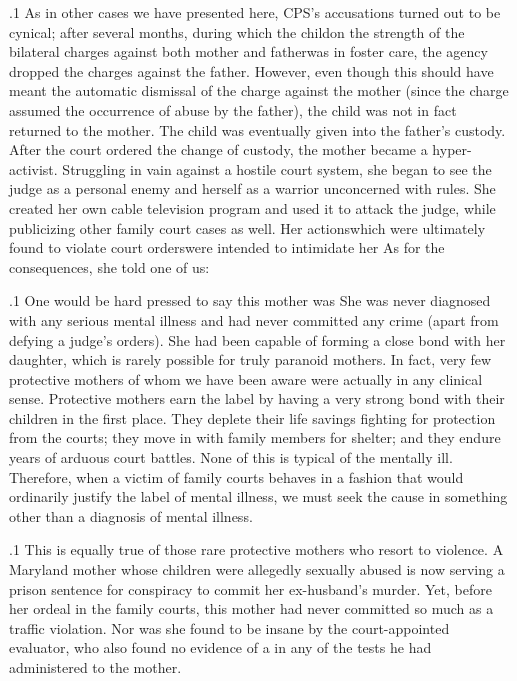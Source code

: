 \documentclass[11pt, twoside]{article}
\begin{document}
{\p.1{%
As in other cases we have presented here, CPS’s accusations turned
out to be cynical; after several months, during which the child\mdash{}on the
strength of the bilateral charges against both mother and father\mdash{}was
in foster care, the agency dropped the charges against the father. However, even though this should have meant the automatic dismissal of the
 charge against the mother (since the charge assumed
the occurrence of abuse by the father), the child was not in fact returned
to the mother. The child was eventually given into the father’s custody.
After the court ordered the change of custody, the mother became
a hyper-activist. Struggling in vain against a hostile court system, she
began to see the judge as a personal enemy and herself as a warrior
unconcerned with rules. She created her own cable television program
and used it to attack the judge, while publicizing other family court
cases as well. Her actions\mdash{}which were ultimately found to violate court
orders\mdash{}were intended to intimidate her  As for the consequences, she told one of us: 
}%

\p.1{%
One would be hard pressed to say this mother was  She was
never diagnosed with any serious mental illness and had never committed any crime (apart from defying a judge’s orders). She had been capable
of forming a close bond with her daughter, which is rarely possible for
truly paranoid mothers. In fact, very few protective mothers of whom we
have been aware were actually  in any clinical sense. Protective
mothers earn the label  by having a very strong bond with
their children in the first place. They deplete their life savings fighting
for protection from the courts; they move in with family members for
shelter; and they endure years of arduous court battles. None of this is
typical of the mentally ill. Therefore, when a victim of family courts behaves in a fashion that would ordinarily justify the label of mental illness,
we must seek the cause in something other than a diagnosis of mental
illness.
}%

\p.1{%
This is equally true of those rare protective mothers who resort to
violence. A Maryland mother whose children were allegedly sexually
abused is now serving a prison sentence for conspiracy to commit her
ex-husband’s murder. Yet, before her ordeal in the family courts, this
mother had never committed so much as a traffic violation. Nor was she
found to be insane by the court-appointed evaluator, who also found no
evidence of a  in any of the tests he had administered
to the mother.
}%

}
\end{document}
